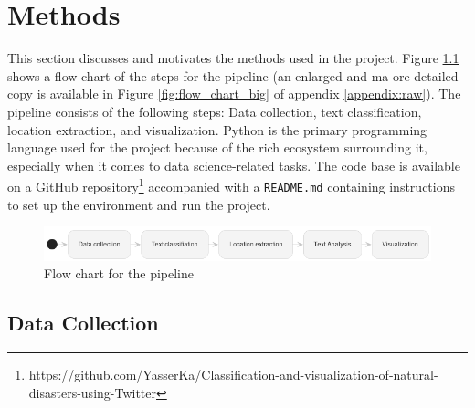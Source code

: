 \chapter{Methods}

This section discusses and motivates the methods used in the project. Figure \ref{fig:flow_chart}
shows a flow chart of the steps for the pipeline (an enlarged and ma ore detailed copy is available in
Figure \ref{fig:flow_chart_big} of appendix \ref{appendix:raw}). The pipeline consists of the
following steps: Data collection, text classification, location extraction, and visualization.
Python is the primary programming language used for the project because of the rich ecosystem
surrounding it, especially when it comes to data science-related tasks. The code base is available
on a GitHub
repository\footnote{https://github.com/YasserKa/Classification-and-visualization-of-natural-disasters-using-Twitter}
accompanied with a \texttt{README.md} containing instructions to set up the environment and run the
project.

\begin{figure}[H]
\begin{center}
  \includegraphics[width=\columnwidth]{./images/pipeline_concise.png}
\end{center}
\caption{Flow chart for the pipeline}
\label{fig:flow_chart}
\end{figure}

\section{Data Collection}

